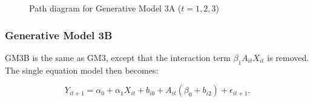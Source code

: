 \documentclass[
  12pt,
  a4paper,
]{article}
\begin{document}
\begin{figure}[H]

\caption{\label{fig-GM3A_path}Path diagram for Generative Model 3A
(\(t = 1, 2, 3\))}


\end{figure}%

\subsubsection{Generative Model 3B}\label{generative-model-3b}

GM3B is the same as GM3, except that the interaction term
\(\beta_1 A_{it} X_{it}\) is removed. The single equation model then
becomes:

\[
Y_{it+1} = \alpha_0 + \alpha_1 X_{it} + b_{i0} + A_{it} (\beta_0 + b_{i2}) + \epsilon_{it+1}.
\]
\end{document}
